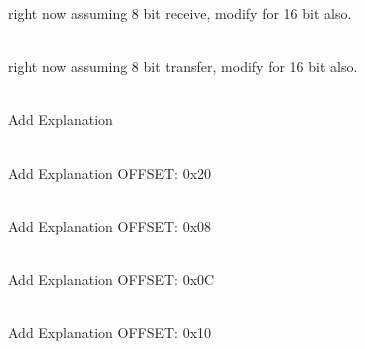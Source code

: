 \begin{DoxyRefList}
\label{todo__todo000069}%
%
right now assuming 8 bit receive, modify for 16 bit also.  
\item[{\parbox[t]{\linewidth}{Member \doxylink{group___s_p_i___a_p_i___p_r_o_t_o_t_y_p_e_s_ga84fe922cab70472a7ae10fc726de8d10}{SPIx\+\_\+\+Send\+Data\+IT} (\doxylink{struct_s_p_ix___handle__t}{SPIx\+\_\+\+Handle\+\_\+t} \texorpdfstring{$\ast$}{*}p\+Handle, uint8\+\_\+t \texorpdfstring{$\ast$}{*}p\+Tx\+Buf, uint32\+\_\+t Len)}}]\hfill \\
\label{todo__todo000068}%
%
right now assuming 8 bit transfer, modify for 16 bit also.  
\item[{\parbox[t]{\linewidth}{Member \doxylink{group___s_y_s_c_f_g___r_e_g_ga3c833fe1c486cb62250ccbca32899cb8}{SYSCFG} }}]\hfill \\
\label{todo__todo000002}%
%
Add Explanation  
\item[{\parbox[t]{\linewidth}{Member \doxylink{struct_s_y_s_c_f_g___reg_def__t_a92fe8a2cca110972ae1bc6e9cc229848}{SYSCFG\+\_\+\+Reg\+Def\+\_\+t\+::CMPCR} }}]\hfill \\
\label{todo__todo000063}%
%
Add Explanation OFFSET\+: 0x20  
\item[{\parbox[t]{\linewidth}{Member \doxylink{struct_s_y_s_c_f_g___reg_def__t_abb0ba14ceed44971a21712a9ddbe205c}{SYSCFG\+\_\+\+Reg\+Def\+\_\+t\+::EXTICR1} }}]\hfill \\
\label{todo__todo000057}%
%
Add Explanation OFFSET\+: 0x08  
\item[{\parbox[t]{\linewidth}{Member \doxylink{struct_s_y_s_c_f_g___reg_def__t_aa553af3d6e18b5b83b364f38a8a06854}{SYSCFG\+\_\+\+Reg\+Def\+\_\+t\+::EXTICR2} }}]\hfill \\
\label{todo__todo000058}%
%
Add Explanation OFFSET\+: 0x0C  
\item[{\parbox[t]{\linewidth}{Member \doxylink{struct_s_y_s_c_f_g___reg_def__t_a32d87a6ff68cccfae52a00302c597fd4}{SYSCFG\+\_\+\+Reg\+Def\+\_\+t\+::EXTICR3} }}]\hfill \\
\label{todo__todo000059}%
%
Add Explanation OFFSET\+: 0x10  
\item[{\parbox[t]{\linewidth}{Member \doxylink{struct_s_y_s_c_f_g___reg_def__t_a953b3f9b9979f643d27c740c30cf1533}{SYSCFG\+\_\+\+Reg\+Def\+\_\+t\+::EXTICR4} }}]\hfill \\
\label{todo__todo000060}%
%

\end{DoxyRefList}
